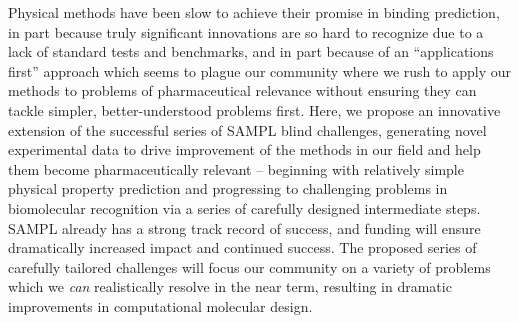 \documentclass[11pt]{article}
\begin{document}
Physical methods have been slow to achieve their promise in binding prediction, in part because truly significant innovations are so hard to recognize due to a lack of standard tests and benchmarks, and in part because of an ``applications first'' approach which seems to plague our community where we rush to apply our methods to problems of pharmaceutical relevance without ensuring they can tackle simpler, better-understood problems first.
Here, we propose an innovative extension of the successful series of SAMPL blind challenges, generating novel experimental data to drive improvement of the methods in our field and help them become pharmaceutically relevant -- beginning with relatively simple physical property prediction and progressing to challenging problems in biomolecular recognition via a series of carefully designed intermediate steps.
SAMPL already has a strong track record of success, and funding will ensure dramatically increased impact and continued success.
The proposed series of carefully tailored challenges will focus our community on a variety of problems which we \emph{can} realistically resolve in the near term, resulting in dramatic improvements in computational molecular design.


\eject

%

%

\eject

\end{document}
